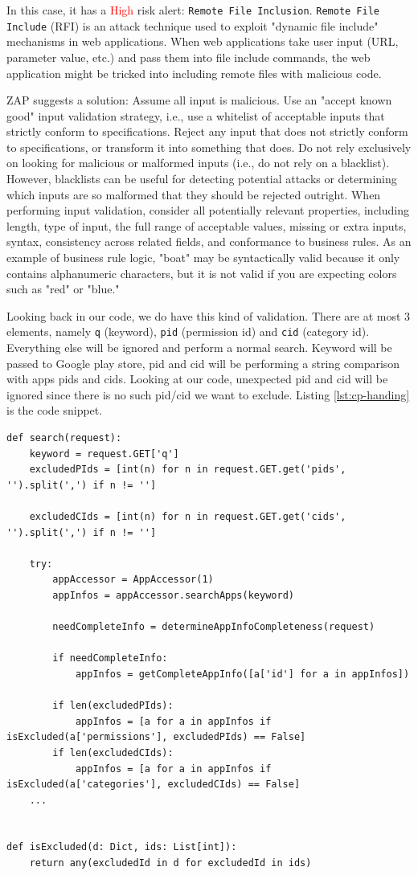 \documentclass[12pt, a4paper]{article}
\newcommand{\code}[1]{\texttt{#1}}
\begin{document}
In this case, it has a \textcolor{red}{High} risk alert: \code{Remote File Inclusion}. \code{Remote File Include} (RFI) is an attack technique used to exploit "dynamic file include" mechanisms in web applications. When web applications take user input (URL, parameter value, etc.) and pass them into file include commands, the web application might be tricked into including remote files with malicious code.

ZAP suggests a solution: 
Assume all input is malicious. Use an "accept known good" input validation strategy, i.e., use a whitelist of acceptable inputs that strictly conform to specifications. Reject any input that does not strictly conform to specifications, or transform it into something that does. Do not rely exclusively on looking for malicious or malformed inputs (i.e., do not rely on a blacklist). However, blacklists can be useful for detecting potential attacks or determining which inputs are so malformed that they should be rejected outright.
When performing input validation, consider all potentially relevant properties, including length, type of input, the full range of acceptable values, missing or extra inputs, syntax, consistency across related fields, and conformance to business rules. As an example of business rule logic, "boat" may be syntactically valid because it only contains alphanumeric characters, but it is not valid if you are expecting colors such as "red" or "blue."

Looking back in our code, we do have this kind of validation. There are at most 3 elements, namely \code{q} (keyword), \code{pid} (permission id) and \code{cid} (category id). Everything else will be ignored and perform a normal search. Keyword will be passed to Google play store, pid and cid will be performing a string comparison with apps pids and cids. Looking at our code, unexpected pid and cid will be ignored since there is no such pid/cid we want to exclude. Listing \ref{lst:cp-handing} is the code snippet.


\begin{lstlisting}[frame=tb, caption=Pid/Cid Input Handling, label=lst:cp-handing]
def search(request):
	keyword = request.GET['q']
	excludedPIds = [int(n) for n in request.GET.get('pids', '').split(',') if n != '']

	excludedCIds = [int(n) for n in request.GET.get('cids', '').split(',') if n != '']

	try:
		appAccessor = AppAccessor(1)
		appInfos = appAccessor.searchApps(keyword)

		needCompleteInfo = determineAppInfoCompleteness(request)

		if needCompleteInfo:
			appInfos = getCompleteAppInfo([a['id'] for a in appInfos])

		if len(excludedPIds):
			appInfos = [a for a in appInfos if isExcluded(a['permissions'], excludedPIds) == False]
		if len(excludedCIds):
			appInfos = [a for a in appInfos if isExcluded(a['categories'], excludedCIds) == False]
    ...


def isExcluded(d: Dict, ids: List[int]):
	return any(excludedId in d for excludedId in ids)
\end{lstlisting}
\end{document}
